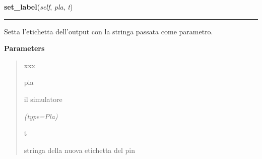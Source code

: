     \label{component:OutPin:set_label}

    \vspace{0.5ex}

\hspace{.8\funcindent}\begin{boxedminipage}{\funcwidth}

    \raggedright \textbf{set\_label}(\textit{self}, \textit{pla}, \textit{t})

    \vspace{-1.5ex}

    \rule{\textwidth}{0.5\fboxrule}
\setlength{\parskip}{2ex}
    Setta l'etichetta dell'output con la stringa passata come parametro.

\setlength{\parskip}{1ex}
      \textbf{Parameters}
      \vspace{-1ex}

      \begin{quote}
        \begin{Ventry}{xxx}

          \item[pla]

          il simulatore

            {\it (type=Pla)}

          \item[t]

          stringa della nuova etichetta del pin

        \end{Ventry}

      \end{quote}

    \end{boxedminipage}

    \label{component:OutPin:reset_label}

    \vspace{0.5ex}

